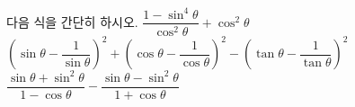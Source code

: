 다음 식을 간단히 하시오.
 $\dfrac{1-\sin^4\theta}{\cos^2\theta}+\cos^2\theta$
 $\left(\sin\theta-\dfrac{1}{\sin\theta}\right)^2+\left(\cos\theta-\dfrac{1}{\cos\theta}\right)^2-\left(\tan\theta-\dfrac{1}{\tan\theta}\right)^2$
 $\dfrac{\sin\theta+\sin^2\theta}{1-\cos\theta}-\dfrac{\sin\theta-\sin^2\theta}{1+\cos\theta}$
